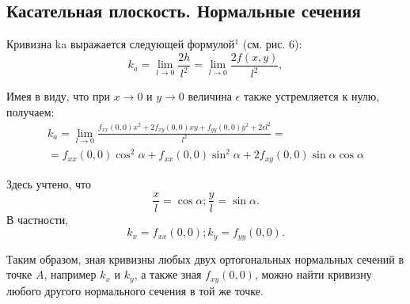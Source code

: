 \documentclass[a4paper,12pt]{article}
\begin{document}
	\subsection{Касательная плоскость. Нормальные сечения}
  	Кривизна ka выражается следующей формулой$^1$ (см. рис. 6):
  	\begin{displaymath}
  		k_a=\lim_{l \to 0}
  		\frac{2h}{l^{2}} =
  		\lim_{l \to 0}
  		\frac{2f(x,y)}{l^2},
	\end{displaymath}  
	
	Имея в виду, что при $x \rightarrow 0$ и $y \rightarrow 0$ величина $\epsilon$ также устремляется к нулю, получаем:		
	\begin{equation}
	\label{eq:z5l}
	\begin{split}
		k_a=\lim_{l \to 0}
		\frac{f_{xx}(0,0)x^2 + 2f_{xy}(0,0)xy +f_{yy}(0,0)y^2 + 2\epsilon l^2}{l^2} = \\
		=f_{xx}(0,0)\cos^2{\alpha} + f_{xx}(0,0)\sin^2{\alpha} + 2f_{xy}(0,0)\sin{\alpha}\cos{\alpha} 
	\end{split}
	\end{equation}
	
	Здесь учтено, что
	\begin{displaymath}
		\frac{x}{l}=\cos{\alpha};
		\frac{y}{l}=\sin{\alpha}.
	\end{displaymath}
	В частности, 
	\begin{equation}
		\label{eq:z6l}
		k_x=f_{xx}(0,0);
		k_y=f_{yy}(0,0).
	\end{equation}
	
	Таким образом, зная кривизны любых двух ортогональных
	нормальных сечений в точке $A$, например $k_x$ и $k_y$, а также зная $f_{xy}(0,0)$, можно найти кривизну любого другого нормального сечения в той же точке.

\end{document}
